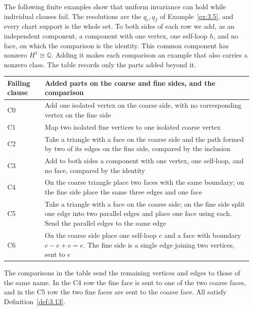 \begin{example}\label{ex:3.25}

The following finite examples show that uniform invariance can hold while individual
clauses fail.
The resolutions are the $q_c,q_f$ of Example~\ref{ex:3.5}, and every chart support is
the whole set.
To both sides of each row we add, as an independent component, a component with one
vertex, one self-loop $h$, and no face, on which the comparison is the identity.
This common component has nonzero $H^1\cong\mathbb{Q}$.
Adding it makes each comparison an example that also carries a nonzero class.
The table records only the parts added beyond it.

\begin{xltabular}{\linewidth}{@{}LL@{}}
\toprule
Failing clause & Added parts on the coarse and fine sides, and the comparison \\
\midrule
\endhead
C0 & Add one isolated vertex on the coarse side, with no corresponding vertex on the fine side \\
\addlinespace[3pt]
C1 & Map two isolated fine vertices to one isolated coarse vertex \\
\addlinespace[3pt]
C2 & Take a triangle with a face on the coarse side and the path formed by two of its edges on the fine side, compared by the inclusion \\
\addlinespace[3pt]
C3 & Add to both sides a component with one vertex, one self-loop, and no face, compared by the identity \\
\addlinespace[3pt]
C4 & On the coarse triangle place two faces with the same boundary; on the fine side place the same three edges and one face \\
\addlinespace[3pt]
C5 & Take a triangle with a face on the coarse side; on the fine side split one edge into two parallel edges and place one face using each. Send the parallel edges to the same edge \\
\addlinespace[3pt]
C6 & On the coarse side place one self-loop $e$ and a face with boundary $e-e+e=e$. The fine side is a single edge joining two vertices, sent to $e$ \\
\bottomrule
\end{xltabular}

The comparisons in the table send the remaining vertices and edges to those of the
same name.
In the C4 row the fine face is sent to one of the two coarse faces, and in the C5
row the two fine faces are sent to the coarse face.
All satisfy Definition~\ref{def:3.13}.


\end{example}
